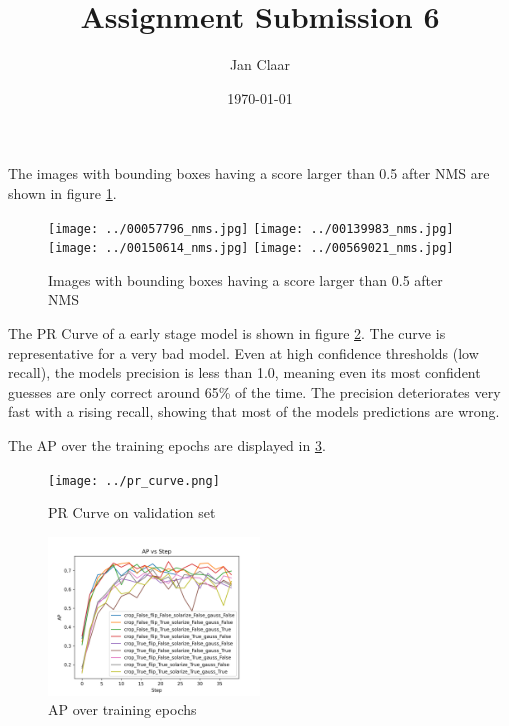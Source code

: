 \documentclass[
    headings=optiontohead,              %
    12pt,                               %
    DIV=13,                             %
    twoside=false,                      %
    open=right,                         %
    BCOR=00mm,                          %
    toc=bibliographynumbered,            %
    parskip=half,                       %
]{scrarticle}
\title{Assignment Submission 6}
\author{Jan Claar}
\date{\today}
\begin{document}
    \head 


    The images with bounding boxes having a score larger than 0.5 after NMS are shown in figure \ref{fig:6.1}.
    \begin{figure}[htpb]
        \centering
        \texttt{[image: ../00057796\_nms.jpg]}
        \texttt{[image: ../00139983\_nms.jpg]}
        \texttt{[image: ../00150614\_nms.jpg]}
        \texttt{[image: ../00569021\_nms.jpg]}
        \caption{Images with bounding boxes having a score larger than 0.5 after NMS}
        \label{fig:6.1}
    \end{figure}
    

    The PR Curve of a early stage model is shown in figure \ref{fig:6.3}. The curve is representative for a very bad model. Even at high confidence thresholds (low recall), the models precision is less than 1.0, meaning even its most confident guesses are only correct around 65\% of the time. 
    The precision deteriorates very fast with a rising recall, showing that most of the models predictions are wrong.
    
    The AP over the training epochs are displayed in \ref{fig:6.3c}.

    \begin{figure}[htpb]
        \centering
        \texttt{[image: ../pr\_curve.png]}
        \caption{PR Curve on validation set}
        \label{fig:6.3}
    \end{figure}

    \begin{figure}
        \begin{center}
            \includegraphics[width=0.5\textwidth]{../ap_vs_step.png}
        \end{center}
        \caption{AP over training epochs}
        \label{fig:6.3c}
    \end{figure}

    
\end{document}
